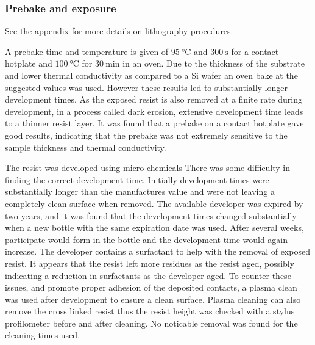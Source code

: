\subsubsection{Prebake and exposure}
See the appendix for more details on lithography procedures.

A prebake time and temperature is given of $\SI{95}{\celsius}$ and $\SI{300}{\second}$ for a contact hotplate and $\SI{100}{\celsius}$ for  $\SI{30}{\minute}$ in an oven. 
 Due to the thickness of the substrate and lower thermal conductivity as compared to a Si wafer an oven bake at the suggested values was used. However these results led to substantially longer development times. As the exposed resist is also removed at a finite rate during development, in a process called dark erosion, extensive development time leads to a thinner resist layer. It was found that a prebake on a contact hotplate gave good results, indicating that the prebake was not extremely sensitive to the sample thickness and thermal conductivity. 
 
 The resist was developed using micro-chemicals 
 There was some difficulty in finding the correct development time. Initially development times were substantially longer than the manufactures value and were not leaving a completely clean surface when removed. The available developer was expired by two years, and it was found that the development times changed substantially when a new bottle with the same expiration date was used. After several weeks, participate would form in the bottle and the development time would again increase. The developer contains a surfactant to help with the removal of exposed resist. It appears that the resist left more residues as the resist aged, possibly indicating a reduction in surfactants as the developer aged. To counter these issues, and promote proper adhesion of the deposited contacts, a plasma clean was used after development to ensure a clean surface. Plasma cleaning can also remove the cross linked resist thus the resist height was checked with a stylus profilometer before and after cleaning. No noticable removal was found for the cleaning times used. 
 \FloatBarrier
